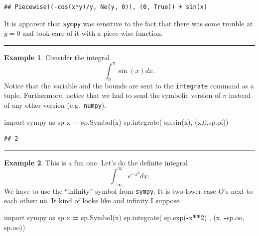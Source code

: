 \documentclass[
]{book}
\newenvironment{Shaded}{\begin{snugshade}}{\end{snugshade}}
\newcommand{\DecValTok}[1]{\textcolor[rgb]{0.00,0.00,0.81}{#1}}
\newcommand{\ImportTok}[1]{#1}
\newcommand{\NormalTok}[1]{#1}
\newcommand{\OperatorTok}[1]{\textcolor[rgb]{0.81,0.36,0.00}{\textbf{#1}}}
\newcommand{\StringTok}[1]{\textcolor[rgb]{0.31,0.60,0.02}{#1}}
\theoremstyle{definition}
\theoremstyle{definition}
\newtheorem{example}{Example}[chapter]
\theoremstyle{definition}
\theoremstyle{remark}
\begin{document}
\begin{verbatim}
## Piecewise((-cos(x*y)/y, Ne(y, 0)), (0, True)) + sin(x)
\end{verbatim}

It is apparent that \texttt{sympy} was sensitive to the fact that there was some trouble at \(y=0\) and took care of it with a piece wise function.

\begin{center}\rule{0.5\linewidth}{0.5pt}\end{center}

\begin{example}
\protect\hypertarget{exm:unnamed-chunk-806}{}{\label{exm:unnamed-chunk-806} }Consider the integral \[\int_0^\pi \sin(x) dx.\] Notice that the variable and the bounds are sent to the \texttt{integrate} command as a tuple. Furthermore, notice that we had to send the symbolic version of \(\pi\) instead of any other version (e.g.~\texttt{numpy}).
\end{example}

\begin{Shaded}
\begin{Highlighting}[]
\ImportTok{import}\NormalTok{ sympy }\ImportTok{as}\NormalTok{ sp}
\NormalTok{x }\OperatorTok{=}\NormalTok{ sp.Symbol(}\StringTok{\textquotesingle{}x\textquotesingle{}}\NormalTok{)}
\NormalTok{sp.integrate( sp.sin(x), (x,}\DecValTok{0}\NormalTok{,sp.pi))}
\end{Highlighting}
\end{Shaded}

\begin{verbatim}
## 2
\end{verbatim}

\begin{center}\rule{0.5\linewidth}{0.5pt}\end{center}

\begin{example}
\protect\hypertarget{exm:unnamed-chunk-808}{}{\label{exm:unnamed-chunk-808} }This is a fun one. Let's do the definite integral
\[\int_{-\infty}^\infty e^{-x^2} dx.\]
We have to use the ``infinity'' symbol from \texttt{sympy}. It is two lower-case O's next to each other: \texttt{oo}. It kind of looks like and infinity I suppose.
\end{example}

\begin{Shaded}
\begin{Highlighting}[]
\ImportTok{import}\NormalTok{ sympy }\ImportTok{as}\NormalTok{ sp}
\NormalTok{x }\OperatorTok{=}\NormalTok{ sp.Symbol(}\StringTok{\textquotesingle{}x\textquotesingle{}}\NormalTok{)}
\NormalTok{sp.integrate( sp.exp(}\OperatorTok{{-}}\NormalTok{x}\OperatorTok{**}\DecValTok{2}\NormalTok{) , (x, }\OperatorTok{{-}}\NormalTok{sp.oo, sp.oo))}
\end{Highlighting}
\end{Shaded}
\end{document}
